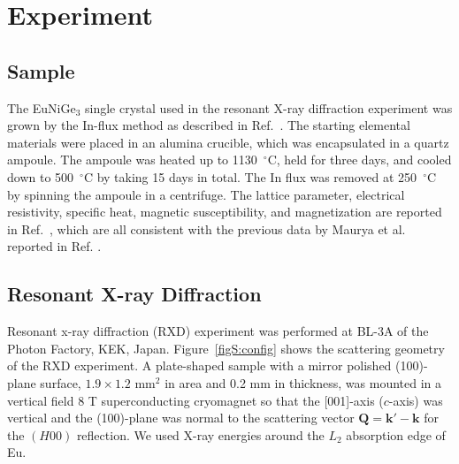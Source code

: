 \documentclass[aps,prb,reprint,superscriptaddress,amsmath,amssymb]{revtex4-2}
\begin{document}
\renewcommand{\topfraction}{1.0}
\renewcommand{\bottomfraction}{1.0}
\renewcommand{\dbltopfraction}{1.0}
\renewcommand{\textfraction}{0.01}
\renewcommand{\floatpagefraction}{1.0}
\renewcommand{\dblfloatpagefraction}{1.0}
\setcounter{topnumber}{5}
\setcounter{bottomnumber}{5}
\setcounter{totalnumber}{10}

\renewcommand{\theequation}{S\arabic{equation}}
\renewcommand{\thefigure}{S\arabic{figure}}
\renewcommand{\thetable}{S-\Roman{table}}
\setcounter{section}{0}
\setcounter{equation}{0}
\setcounter{figure}{0}
\setcounter{page}{1}

\section{Experiment}
\subsection{Sample}
The EuNiGe$_3$ single crystal used in the resonant X-ray diffraction experiment was grown by the In-flux method as described in Ref.~. 
The starting elemental materials were placed in an alumina crucible, which was encapsulated in a quartz ampoule. 
The ampoule was heated up to 1130~$^{\circ}$C, held for three days, and cooled down to 500~$^{\circ}$C by taking 15 days in total. 
The In flux was removed at 250~$^{\circ}$C by spinning the ampoule in a centrifuge. 
The lattice parameter, electrical resistivity, specific heat, magnetic susceptibility, and magnetization are reported in Ref.~, which are all consistent with the previous data by Maurya et al. reported in Ref. . 


\subsection{Resonant X-ray Diffraction}
Resonant x-ray diffraction (RXD) experiment was performed at BL-3A of the Photon Factory, KEK, Japan. 
Figure~\ref{figS:config} shows the scattering geometry of the RXD experiment. 
A plate-shaped sample with a mirror polished (100)-plane surface, $1.9 \times 1.2$ mm$^2$ in area and 0.2 mm in thickness, was mounted in a vertical field 8 T superconducting cryomagnet so that the [001]-axis ($c$-axis) was vertical and the (100)-plane was normal to the scattering vector $\bm{Q}=\bm{k}' - \bm{k}$ for the $(H 0 0)$ reflection. 
We used X-ray energies around the $L_2$ absorption edge of Eu. 
\end{document}
